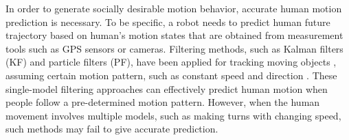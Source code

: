 \documentclass[letterpaper, 10 pt, conference]{ieeeconf}
\newcommand{\todonote}[1]{\vspace{0px} %
	\todo[inline, color=green!30]{\textbf{[Note:]} {#1}} %
}
\newcommand{\todohere}[1]{\hl{(\textbf{TODO:} #1)}}
\begin{document}
	In order to generate socially desirable motion behavior, accurate human motion prediction is necessary.
	To be specific, a robot needs to predict human future trajectory based on human's motion states that are obtained from measurement tools such as GPS sensors or cameras.
	Filtering methods, such as Kalman filters (KF) and particle filters (PF), have been applied for tracking moving objects \cite {koller1994robust,rui2001better}, assuming certain motion pattern, such as constant speed and direction \cite{svenstrup2010trajectory}. %
	These single-model filtering approaches can effectively predict human motion when people follow a pre-determined motion pattern.
	However, when the human movement involves multiple models, such as making turns with changing speed, such methods may fail to give accurate prediction.
	
	
\end{document}

